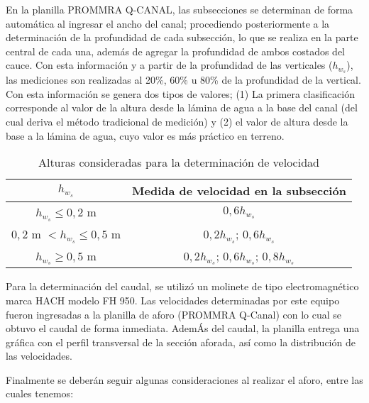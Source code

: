 \documentclass[]{article}
\begin{document}
En la planilla PROMMRA Q-CANAL, las subsecciones se determinan de forma
automática al ingresar el ancho del canal; procediendo posteriormente a
la determinación de la profundidad de cada subsección, lo que se realiza
en la parte central de cada una, además de agregar la profundidad de
ambos costados del cauce. Con esta información y a partir de la
profundidad de las verticales (\(h_{w_s}\)), las mediciones son
realizadas al 20\%, 60\% u 80\% de la profundidad de la vertical. Con
esta información se genera dos tipos de valores; (1) La primera
clasificación corresponde al valor de la altura desde la lámina de agua
a la base del canal (del cual deriva el método tradicional de medición)
y (2) el valor de altura desde la base a la lámina de agua, cuyo valor
es más práctico en terreno.

\begin{table}[H]
 \caption{Alturas consideradas para la determinación de velocidad}
 \centering
 \begin{tabu} {cc}
 \toprule
 $h_{w_s}$ & Medida de velocidad en la subsección\\
 \midrule 
    $h_{w_s} \leq 0,2$ m & $0,6h_{w_s}$ \\ 
    $0,2$ m $< h_{w_s} \leq 0,5$ m  & $0,2h_{w_s}$; $0,6h_{w_s}$\\ 
    $h_{w_s} \geq 0,5$ m & $0,2h_{w_s}$; $0,6h_{w_s}$; $0,8h_{w_s}$\\
    \hline 
 \end{tabu}
\end{table}

Para la determinación del caudal, se utilizó un molinete de tipo
electromagnético marca HACH modelo FH 950. Las velocidades determinadas
por este equipo fueron ingresadas a la planilla de aforo (PROMMRA
Q-Canal) con lo cual se obtuvo el caudal de forma inmediata. AdemÁs del
caudal, la planilla entrega una gráfica con el perfil transversal de la
sección aforada, así como la distribución de las velocidades.

Finalmente se deberán seguir algunas consideraciones al realizar el
aforo, entre las cuales tenemos:
\end{document}

